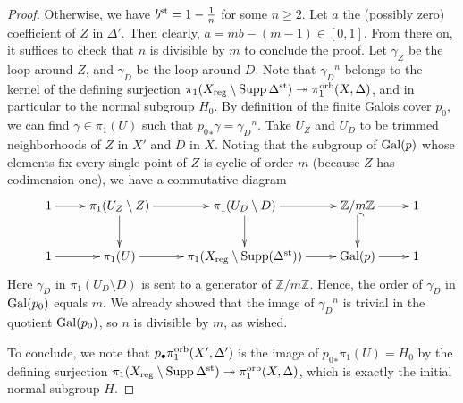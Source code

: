 \documentclass{amsart}
\theoremstyle{definition}
\theoremstyle{remark}
\numberwithin{equation}{section}
\begin{document}
\begin{proof}
    Otherwise, we have $b^{\rm st} = 1-\frac{1}{n}$ for some $n\ge 2$. Let $a$ the (possibly zero) coefficient of $Z$ in $\Delta'$. Then clearly, $a=mb-(m-1)\in [0,1]$. From there on, it suffices to check that $n$ is divisible by $m$ to conclude the proof. Let $\gamma_Z$ be the loop around $Z$, and $\gamma_D$ be the loop around $D$. Note that ${\gamma_D}^n$ belongs to the kernel of the defining surjection $\pi_1(X_{\rm reg}\setminus{\rm Supp}\,\Delta^{\rm st})\twoheadrightarrow \pi_1^{\rm orb}(X,\Delta)$, and in particular to the normal subgroup $H_0$. By definition of the finite Galois cover $p_0$, we can find $\gamma\in\pi_1(U)$ such that ${p_0}_*\gamma = {\gamma_D}^n$.
    Take $U_Z$ and $U_D$ to be trimmed neighborhoods of $Z$ in $X'$ and $D$ in $X$. Noting that the subgroup of ${\rm Gal}(p)$ whose elements fix every single point of $Z$ is cyclic of order $m$ (because $Z$ has codimension one), we have a commutative diagram 
    $$\xymatrix{
    1 \ar[r]
& \pi_1(U_Z\setminus Z) \ar[r] \ar[d]
& \pi_1(U_D\setminus D) \ar[r] \ar[d]
& \mathbb{Z}/m\mathbb{Z} \ar[r] \ar@{^{(}->}[d]
& 1 \\
1 \ar[r]
& \pi_1(U) \ar[r]
& \pi_1(X_{\rm reg}\setminus {\rm Supp}(\Delta^{\rm st})) \ar[r]
& {\rm Gal}(p) \ar[r]
& 1     }$$
Here $\gamma_D$ in $\pi_1(U_D\setminus D)$ is sent to a generator of $\mathbb{Z}/m\mathbb{Z}$. Hence, the order of $\gamma_D$ in ${\rm Gal}(p_0)$ equals $m$. We already showed that the image of ${\gamma_D}^n$ is trivial in the quotient ${\rm Gal}(p_0)$, so $n$ is divisible by $m$, as wished.

To conclude, we note that
$p_{\bullet}\pi_1^{\rm orb}(X',\Delta')$ is the image of ${p_0}_*\pi_1(U)=H_0$ by the defining surjection $\pi_1(X_{\rm reg}\setminus {\rm Supp}\,\Delta^{\rm st})\twoheadrightarrow\pi_1^{\rm orb}(X,\Delta)$, which is exactly the initial normal subgroup $H$. 
\end{proof}
\end{document}
